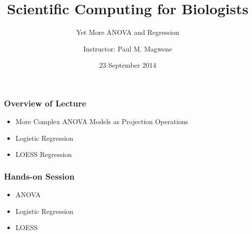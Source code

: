 \documentclass{beamer}
\title{Scientific Computing for Biologists}
\subtitle{Yet More ANOVA and Regression} %
\author{Instructor: Paul M. Magwene}
\date{23 September 2014}
\begin{document}
\begin{frame}
\titlepage
\end{frame}

\begin{frame}
  \frametitle{Overview of Lecture}

\begin{itemize}
		  \item More Complex ANOVA Models as Projection Operations
		  \item Logistic Regression
		  \item LOESS Regression
\end{itemize}

\end{frame}

\begin{frame}
  \frametitle{Hands-on Session}
\begin{itemize}
    \item ANOVA
    \item Logistic Regression
    \item LOESS
\end{itemize}


\end{frame}
\end{document}
